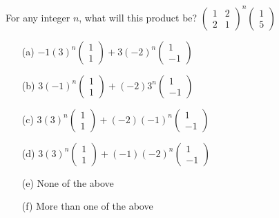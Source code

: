 \begin{problem}
    For any integer $n$, what will this product be?  \( \left( \begin{array}{cc} 1 & 2 \\
        2 & 1 \end{array} \right)^n   \left( \begin{array}{c} 1 \\ 5 \end{array}
    \right) \)
\begin{enumerate}
    \item[(a)] \( -1   (3)^n \left( \begin{array}{c} 1 \\ 1 \end{array} \right) + 3   (-2)^n \left( \begin{array}{c} 1 \\ -1 \end{array} \right) \)
    \item[(b)] \( 3   (-1)^n \left( \begin{array}{c} 1 \\ 1 \end{array} \right) + (-2)   3^n \left( \begin{array}{c} 1 \\ -1 \end{array} \right) \)
    \item[(c)] \( 3   (3)^n \left( \begin{array}{c} 1 \\ 1 \end{array} \right) + (-2)   (-1)^n \left( \begin{array}{c} 1 \\ -1 \end{array} \right) \)
    \item[(d)] \( 3   (3)^n \left( \begin{array}{c} 1 \\ 1 \end{array} \right) + (-1)   (-2)^n \left( \begin{array}{c} 1 \\ -1 \end{array} \right) \)
    \item[(e)] None of the above
    \item[(f)] More than one of the above
\end{enumerate}
\end{problem}
%             



